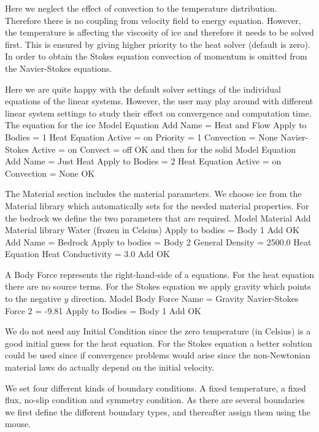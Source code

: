 Here we neglect the effect of convection to the temperature distribution. Therefore there is no coupling 
from velocity field to energy equation. However, the temperature is affecting the viscosity of ice and therefore
it needs to be solved first. This is ensured by giving higher priority to the heat solver
(default is zero). In order to obtain the Stokes equation convection of momentum is omitted 
from the Navier-Stokes equations.	

Here we are quite happy with the default solver settings of the individual equations of the linear systems.
However, the user may play around with different linear system settings to study their effect on 
convergence and computation time.
\\
The equation for the ice
\ttbegin
Model
  Equation
    Add
    Name = Heat and Flow
    Apply to Bodies = 1
    Heat Equation
      Active = on
      Priority = 1
      Convection = None
    Navier-Stokes 
      Active = on
      Convect = off
    OK
\ttend        
and then for the solid
\ttbegin
Model
  Equation
    Add
    Name = Just Heat
    Apply to Bodies = 2
    Heat Equation
      Active = on
      Convection = None
    OK
\ttend    

The Material section includes the material parameters.
We choose ice from the Material library which automatically sets for the needed material properties. 
For the bedrock we define the two parameters that are required. 
\ttbegin
Model
  Material
    Add 
      Material library
        Water (frozen in Celsius)
      Apply to bodies = Body 1 
      Add 
      OK
    Add
      Name = Bedrock
      Apply to bodies = Body 2
      General    
        Density = 2500.0
      Heat Equation
        Heat Conductivity = 3.0
      Add
      OK
\ttend


A Body Force represents the right-hand-side of a equations. For the heat equation there are
no source terms. For the Stokes equation we apply gravity which
points to the negative $y$ direction.
\ttbegin
Model
  Body Force
    Name = Gravity
    Navier-Stokes
      Force 2 = -9.81
    Apply to Bodies = Body 1 
    Add
    OK
\ttend

We do not need any Initial Condition since the zero temperature (in Celsius) is a good initial
guess for the heat equation. For the Stokes equation a better solution could be used since 
if convergence problems would arise since the non-Newtonian material laws do actually depend on the 
initial velocity.

We set four different kinds of boundary conditions. A fixed temperature, a fixed 
flux, no-slip condition and symmetry condition. As there are several boundaries
we first define the different boundary types, and thereafter assign them using the mouse.

